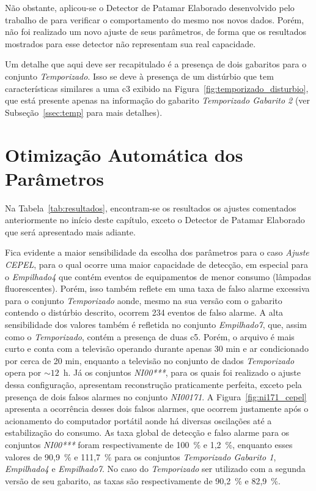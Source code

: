Não obstante, aplicou-se o Detector de Patamar Elaborado desenvolvido
pelo trabalho de \citet*{nilm_cepel_alvaro} para verificar o
comportamento do mesmo nos novos dados. Porém, não foi realizado um
novo ajuste de seus parâmetros, de forma que os resultados mostrados
para esse detector não representam sua real capacidade.

Um detalhe que aqui deve ser recapitulado é a presença de dois
gabaritos para o conjunto \emph{Temporizado}. Isso se deve à presença
de um distúrbio que tem características similares a uma \acs{c3}
exibido na Figura~\ref{fig:temporizado_disturbio}, que está
presente apenas na informação do gabarito \emph{Temporizado Gabarito
2} (ver Subseção~\ref{ssec:temp} para mais detalhes).

\section{Otimização Automática dos Parâmetros}
\label{sec:otim_es}

Na Tabela~\ref{tab:resultados}, encontram-se os
resultados os ajustes comentados anteriormente no início deste
capítulo, exceto o Detector de Patamar Elaborado que será apresentado
mais adiante. 

Fica evidente a maior sensibilidade da escolha dos parâmetros para o
caso \emph{Ajuste CEPEL}, para o qual ocorre uma maior capacidade de detecção,
em especial para o \emph{Empilhado4} que contém eventos de
equipamentos de menor consumo (lâmpadas fluorescentes). Porém, isso
também reflete em uma taxa de falso alarme excessiva para o conjunto
\emph{Temporizado} aonde, mesmo na sua versão com o gabarito contendo o
distúrbio descrito, ocorrem 234 eventos de falso alarme. A alta
sensibilidade dos valores também é refletida no conjunto
\emph{Empilhado7}, que, assim como o \emph{Temporizado}, contém a
presença de duas \acs{c5}. Porém, o arquivo é mais curto e conta com a
televisão operando durante apenas 30 min e ar condicionado por cerca
de 20 min, enquanto a televisão no conjunto de dados
\emph{Temporizado} opera por $\sim12$~h. Já os conjuntos
\emph{NI00***}, para os quais foi realizado o ajuste dessa
configuração, apresentam reconstrução praticamente perfeita, exceto
pela presença de dois falsos alarmes no conjunto \emph{NI00171}. A
Figura~\ref{fig:ni171_cepel} apresenta a ocorrência desses dois falsos
alarmes, que ocorrem justamente após o acionamento do computador
portátil aonde há diversas oscilações até a estabilização do consumo.
As taxa global de detecção e falso alarme para os conjuntos
\emph{NI00***} foram respectivamente de 100~\% e 1,2~\%, enquanto
esses valores de 90,9~\% e 111,7~\% para os conjuntos
\emph{Temporizado Gabarito 1}, \emph{Empilhado4} e \emph{Empilhado7}.
No caso do \emph{Temporizado} ser utilizado com a segunda versão de
seu gabarito, as taxas são respectivamente de 90,2~\% e 82,9~\%.


